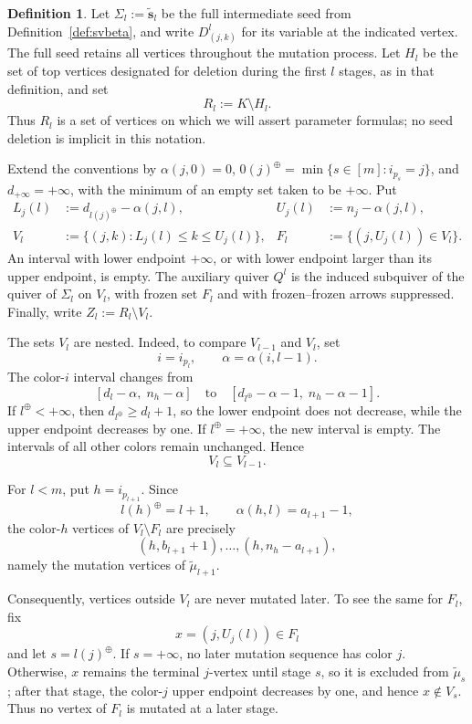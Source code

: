 \documentclass[12pt, reqno]{amsart}
\theoremstyle{plain}
\theoremstyle{definition}
\newtheorem{definition}[theorem]{Definition}
\numberwithin{equation}{section}
\begin{document}
\begin{definition}\label{def:Ql}
Let \(\Sigma_l:=\widetilde{\mathbf s}_l\) be the full intermediate
seed from Definition~\ref{def:svbeta}, and write \(D^l_{(j,k)}\) for
its variable at the indicated vertex. The full seed retains all
vertices throughout the mutation process. Let \(H_l\) be the set of
top vertices designated for deletion during the first \(l\) stages,
as in that definition, and set
\[
 R_l:=K\setminus H_l.
\]
Thus \(R_l\) is a set of vertices on which we will assert parameter
formulas; no seed deletion is implicit in this notation.

Extend the conventions by \(\alpha(j,0)=0\),
\(0(j)^\oplus=\min\{s\in[m]:i_{p_s}=j\}\), and
\(d_{+\infty}=+\infty\), with the minimum of an empty set taken
to be \(+\infty\). Put
\begin{align*}
 L_j(l)&:=d_{l(j)^\oplus}-\alpha(j,l),&
 U_j(l)&:=n_j-\alpha(j,l),\\
 V_l&:=\{(j,k):L_j(l)\leq k\leq U_j(l)\},&
 F_l&:=\{(j,U_j(l))\in V_l\}.
\end{align*}
An interval with lower endpoint \(+\infty\), or with lower endpoint
larger than its upper endpoint, is empty. The auxiliary quiver
\(Q^l\) is the induced subquiver of the quiver of \(\Sigma_l\) on
\(V_l\), with frozen set \(F_l\) and with frozen--frozen arrows
suppressed. Finally, write \(Z_l:=R_l\setminus V_l\).
\end{definition}

The sets \(V_l\) are nested. Indeed, to compare \(V_{l-1}\) and
\(V_l\), set
\[
i=i_{p_l},
\qquad
\alpha=\alpha(i,l-1).
\]
The color-\(i\) interval changes from
\[
[d_l-\alpha,\;n_h-\alpha]
\quad\text{to}\quad
[d_{l^\oplus}-\alpha-1,\;n_h-\alpha-1].
\]
If \(l^\oplus<+\infty\), then \(d_{l^\oplus}\geq d_l+1\), so the
lower endpoint does not decrease, while the upper endpoint decreases
by one. If \(l^\oplus=+\infty\), the new interval is empty. The
intervals of all other colors remain unchanged. Hence
\[
V_l\subseteq V_{l-1}.
\]

For \(l<m\), put \(h=i_{p_{l+1}}\). Since
\[
l(h)^\oplus=l+1,
\qquad
\alpha(h,l)=a_{l+1}-1,
\]
the color-\(h\) vertices of \(V_l\setminus F_l\) are precisely
\[
(h,b_{l+1}+1),\ldots,(h,n_h-a_{l+1}),
\]
namely the mutation vertices of \(\widetilde{\mu}_{l+1}\).

Consequently, vertices outside \(V_l\) are never mutated later. To
see the same for \(F_l\), fix
\[
x=(j,U_j(l))\in F_l
\]
and let \(s=l(j)^\oplus\). If \(s=+\infty\), no later mutation
sequence has color \(j\). Otherwise, \(x\) remains the terminal
\(j\)-vertex until stage \(s\), so it is excluded from
\(\widetilde{\mu}_s\); after that stage, the color-\(j\) upper
endpoint decreases by one, and hence \(x\notin V_s\). Thus no vertex
of \(F_l\) is mutated at a later stage.
\end{document}
